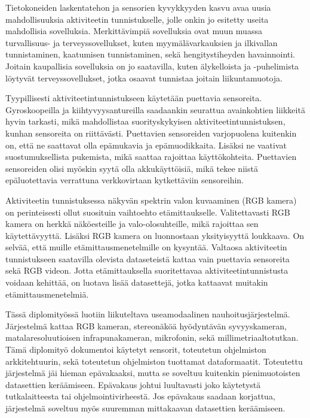 Tietokoneiden laskentatehon ja sensorien kyvykkyyden kasvu avaa uusia mahdollisuuksia aktiviteetin tunnistukselle,
jolle onkin jo esitetty useita mahdollisia sovelluksia.
Merkittävimpiä sovelluksia ovat muun muassa turvallisuus- ja terveyssovellukset,
kuten myymälävarkauksien ja ilkivallan tunnistaminen, kaatumisen tunnistaminen, sekä hengitystiheyden havainnointi.
Joitain kaupallisia sovelluksia on jo saatavilla,
kuten älykelloista ja -puhelimista löytyvät terveyssovellukset,
jotka osaavat tunnistaa joitain liikuntamuotoja.

Tyypillisesti aktiviteetintunnistukseen käytetään puettavia sensoreita.
Gyroskoopeilla ja kiihtyvyysantureilla saadaankin seurattua avainkohtien liikkeitä hyvin tarkasti,
mikä mahdollistaa suorityskykyisen aktiviteetintunnistuksen,
kunhan sensoreita on riittävästi.
Puettavien sensoreiden varjopuolena kuitenkin on,
että ne saattavat olla epämukavia ja epämuodikkaita.
Lisäksi ne vaativat suostumuksellista pukemista,
mikä saattaa rajoittaa käyttökohteita.
Puettavien sensoreiden olisi myöskin syytä olla akkukäyttöisiä,
mikä tekee niistä epäluotettavia verrattuna verkkovirtaan kytkettäviin sensoreihin.

Aktiviteetin tunnistuksessa näkyvän spektrin valon kuvaaminen (RGB kamera)
on perinteisesti ollut suosituin vaihtoehto etämittaukselle.
Valitettavasti RGB kamera on herkkä näköesteille ja valo-olosuhteille,
mikä rajoittaa sen käytettävyyttä.
Lisäksi RGB kamera on luonnostaan yksityisyyttä loukkaava.
On selvää, että muille etämittausmenetelmille on kysyntää.
Valtaosa aktiviteetin tunnistukseen saatavilla olevista dataseteistä
kattaa vain puettavia sensoreita sekä RGB videon.
Jotta etämittauksella suoritettavaa aktiviteetintunnistusta voidaan kehittää,
on luotava lisää datasettejä, jotka kattaavat muitakin etämittausmenetelmiä.

Tässä diplomityössä luotiin liikuteltava useamodaalinen nauhoitusjärjestelmä.
Järjestelmä kattaa RGB kameran, stereonäköä hyödyntävän syvyyskameran,
matalaresoluutioisen infrapunakameran, mikrofonin, sekä millimetriaaltotutkan.
Tämä diplomityö dokumentoi käytetyt sensorit,
toteutetun ohjelmiston arkkitehtuurin,
sekä toteutetun ohjelmiston tuottamat dataformaatit.
Toteutettu järjestelmä jäi hieman epävakaaksi,
mutta se soveltuu kuitenkin pienimuotoisten datasettien keräämiseen.
Epävakaus johtui luultavasti joko käytetystä tutkalaitteesta tai ohjelmointivirheestä.
Jos epävakaus saadaan korjattua, järjestelmä soveltuu myös suuremman mittakaavan datasettien keräämiseen.